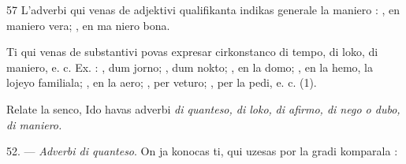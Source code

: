\begin{VUpage}[61]{57}
\VUblancAlinea
L'adverbi qui venas de adjektivi qualifikanta indikas\nl
generale la maniero : , en maniero vera; , en ma\cc
niero bona.

Ti qui venas de substantivi povas expresar cirkonstanco\nl
di tempo, di loko, di maniero, e. c. Ex. : , dum jorno;\nl
{}, dum nokto; , en la domo; , en la hemo, la\nl
lojeyo familiala; , en la aero; , per veturo; ,\nl
per la pedi, e. c. (1).

Relate la senco, Ido havas adverbi \textit{di quanteso, di loko,}\nl
\textit{di afirmo, di nego o dubo, di maniero.}

\VUblanc{6.00pt}%
52. --- \textit{Adverbi di quanteso}. On ja konocas ti, qui uzesas\nl
por la gradi komparala : \nl
{}
\end{VUpage}

